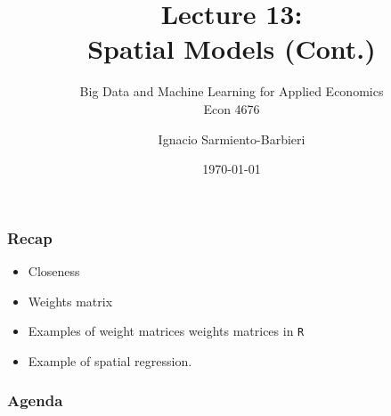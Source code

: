 \documentclass[
  shownotes,
  xcolor={svgnames},
  hyperref={colorlinks,citecolor=DarkBlue,linkcolor=DarkRed,urlcolor=DarkBlue}
  , aspectratio=169]{beamer}
\begin{document}
\title[Lecture 13]{Lecture 13: \\ Spatial Models (Cont.)}
\subtitle{Big Data and Machine Learning for Applied Economics \\ Econ 4676}
\date{\today}

\author[Sarmiento-Barbieri]{Ignacio Sarmiento-Barbieri}


\begin{frame}[noframenumbering]
\maketitle
\end{frame}


\begin{frame}
\frametitle{Recap }

  \begin{itemize} 
        \item Closeness
        \medskip
        \item Weights matrix
        \medskip
        \item Examples of weight matrices weights matrices in \texttt{R}
        \medskip
        \item Example of spatial regression.
        
  \end{itemize}

\end{frame}


\begin{frame}
\frametitle{Agenda}

\tableofcontents

\end{frame}




\end{document}
